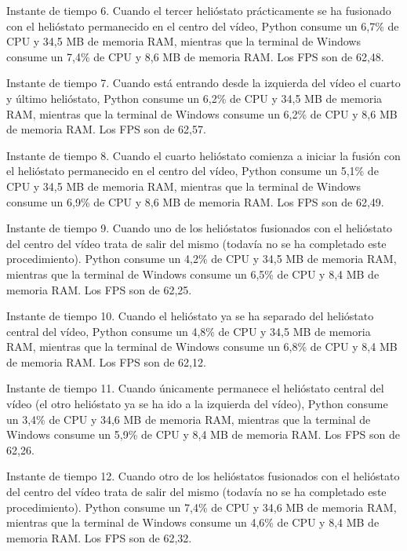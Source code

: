 \documentclass[12pt]{article}
\begin{document}
Instante de tiempo 6. Cuando el tercer helióstato prácticamente se ha fusionado con el helióstato permanecido en el centro del vídeo, Python consume un 6,7\% de CPU y 34,5 MB de memoria RAM, mientras que la terminal de Windows consume un 7,4\% de CPU y 8,6 MB de memoria RAM. Los FPS son de 62,48.




Instante de tiempo 7. Cuando está entrando desde la izquierda del vídeo el cuarto y último helióstato, Python consume un 6,2\% de CPU y 34,5 MB de memoria RAM, mientras que la terminal de Windows consume un 6,2\% de CPU y 8,6 MB de memoria RAM. Los FPS son de 62,57.




Instante de tiempo 8. Cuando el cuarto helióstato comienza a iniciar la fusión con el helióstato permanecido en el centro del vídeo, Python consume un 5,1\% de CPU y 34,5 MB de memoria RAM, mientras que la terminal de Windows consume un 6,9\% de CPU y 8,6 MB de memoria RAM. Los FPS son de 62,49.




Instante de tiempo 9. Cuando uno de los helióstatos fusionados con el helióstato del centro del vídeo trata de salir del mismo (todavía no se ha completado este procedimiento). Python consume un 4,2\% de CPU y 34,5 MB de memoria RAM, mientras que la terminal de Windows consume un 6,5\% de CPU y 8,4 MB de memoria RAM. Los FPS son de 62,25.




Instante de tiempo 10. Cuando el helióstato ya se ha separado del helióstato central del vídeo, Python consume un 4,8\% de CPU y 34,5 MB de memoria RAM, mientras que la terminal de Windows consume un 6,8\% de CPU y 8,4 MB de memoria RAM. Los FPS son de 62,12.




Instante de tiempo 11. Cuando únicamente permanece el helióstato central del vídeo (el otro helióstato ya se ha ido a la izquierda del vídeo), Python consume un 3,4\% de CPU y 34,6 MB de memoria RAM, mientras que la terminal de Windows consume un 5,9\% de CPU y 8,4 MB de memoria RAM. Los FPS son de 62,26.




Instante de tiempo 12. Cuando otro de los helióstatos fusionados con el helióstato del centro del vídeo trata de salir del mismo (todavía no se ha completado este procedimiento). Python consume un 7,4\% de CPU y 34,6 MB de memoria RAM, mientras que la terminal de Windows consume un 4,6\% de CPU y 8,4 MB de memoria RAM. Los FPS son de 62,32.
\end{document}
